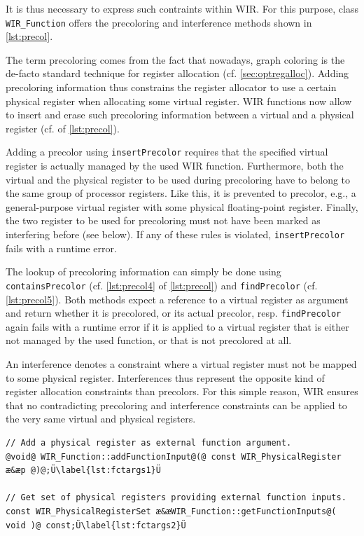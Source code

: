It is thus necessary to express such contraints within \gls{WIR}.
For this purpose, class \texttt{WIR\_Function} offers the precoloring and interference methods shown in \cref{lst:precol}.

The term precoloring comes from the fact that nowadays, graph coloring is the de-facto standard technique for register allocation (cf. \cref{sec:optregalloc}).
Adding precoloring information thus constrains the register allocator to use a certain physical register when allocating some virtual register.
\gls{WIR} functions now allow to insert and erase such precoloring information between a virtual and a physical register (cf.  of \cref{lst:precol}).

Adding a precolor using \texttt{insertPrecolor} requires that the specified virtual register is actually managed by the used \gls{WIR} function.
Furthermore, both the virtual and the physical register to be used during precoloring have to belong to the same group of processor registers.
Like this, it is prevented to precolor, e.g., a general-purpose virtual register with some physical floating-point register.
Finally, the two register to be used for precoloring must not have been marked as interfering before (see below).
If any of these rules is violated, \texttt{insertPrecolor} fails with a runtime error.

The lookup of precoloring information can simply be done using \texttt{containsPrecolor} (cf. \cref{lst:precol4} of \cref{lst:precol}) and \texttt{findPrecolor} (cf. \cref{lst:precol5}).
Both methods expect a reference to a virtual register as argument and return whether it is precolored, or its actual precolor, resp.
\texttt{findPrecolor} again fails with a runtime error if it is applied to a virtual register that is either not managed by the used function, or that is not precolored at all.

An interference denotes a constraint where a virtual register must not be mapped to some physical register.
Interferences thus represent the opposite kind of register allocation constraints than precolors.
For this simple reason, \gls{WIR} ensures that no contradicting precoloring and interference constraints can be applied to the very same virtual and physical registers.

\begin{lstlisting}[style=code,float=t,caption={Handling of Physical Registers Used for Function Argument Passing},label=lst:fctargs]
// Add a physical register as external function argument.
@void@ WIR_Function::addFunctionInput@(@ const WIR_PhysicalRegister æ&æp @)@;Ü\label{lst:fctargs1}Ü

// Get set of physical registers providing external function inputs.
const WIR_PhysicalRegisterSet æ&æWIR_Function::getFunctionInputs@( void )@ const;Ü\label{lst:fctargs2}Ü
\end{lstlisting}

